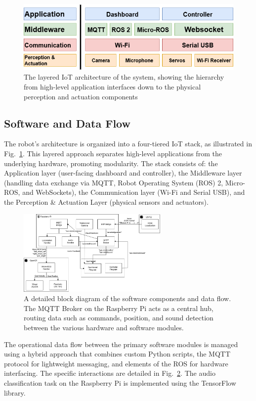 \begin{figure}[!b]
  \centering
  \includegraphics[width=0.65\linewidth]{img/layer.png}
  \caption{The layered IoT architecture of the system, showing the hierarchy from high-level application interfaces down to the physical perception and actuation components}
  \label{fig:layering}
\end{figure}

\subsection{Software and Data Flow}
The robot's architecture is organized into a four-tiered IoT stack, as illustrated in Fig.~\ref{fig:layering}. This layered approach separates high-level applications from the underlying hardware, promoting modularity. The stack consists of: the Application layer (user-facing dashboard and controller), the Middleware layer (handling data exchange via MQTT, Robot Operating System (ROS) 2, Micro-ROS, and WebSockets), the Communication layer (Wi-Fi and Serial USB), and the Perception \& Actuation Layer (physical sensors and actuators).

\begin{figure}[!htbp]
  \centering
  \includegraphics[width=0.65\textwidth]{img/DFD.png}
  \caption{A detailed block diagram of the software components and data flow. The MQTT Broker on the Raspberry Pi acts as a central hub, routing data such as commands, position, and sound detection between the various hardware and software modules.}
  \label{fig:dfd}
\end{figure}

The operational data flow between the primary software modules is managed using a hybrid approach that combines custom Python scripts, the MQTT protocol for lightweight messaging, and elements of the ROS for hardware interfacing. The specific interactions are detailed in Fig.~\ref{fig:dfd}. The audio classification task on the Raspberry Pi is implemented using the TensorFlow library.

